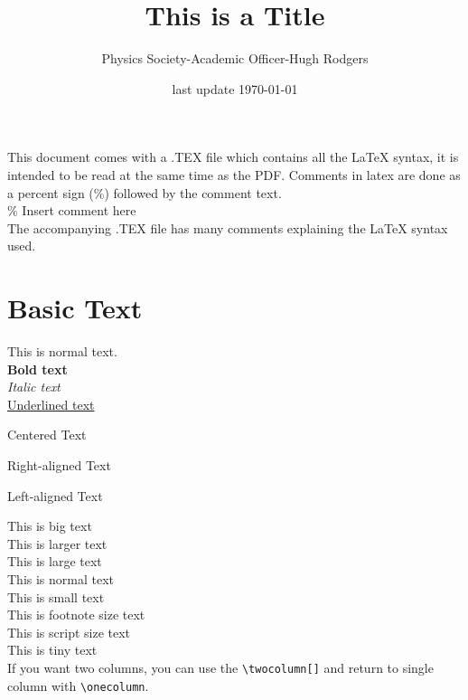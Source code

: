 \documentclass[a4paper,11pt]{article}
\title{This is a Title}
\author{Physics Society-Academic Officer-Hugh Rodgers}
\date{last update \today}
\begin{document}
    \maketitle
    \tableofcontents
    \newpage
    \raggedright

    This document comes with a .TEX file which contains all the LaTeX syntax, it is intended to be read at the same time as the PDF.
    Comments in latex are done as a  percent sign (\%) followed by the comment text. \\ 
    \% Insert comment here\\
    The accompanying .TEX file has many comments explaining the LaTeX syntax used.

    \section{Basic Text}
        This is normal text.\\
        \textbf{Bold text}\\
        \textit{Italic text}\\
        \underline{Underlined text}
        \begin{center}
            Centered Text
        \end{center}

        \begin{flushright}
            Right-aligned Text
        \end{flushright}

        \begin{flushleft}
            Left-aligned Text
        \end{flushleft}

        \Huge{This is big text}\\
        \LARGE{This is larger text}\\
        \Large{This is large text}\\
        \normalsize{This is normal text}\\
        \small{This is small text}\\
        \footnotesize{This is footnote size text}\\
        \scriptsize{This is script size text}\\
        \tiny{This is tiny text}\\

        \normalsize
        If you want two columns, you can use the \texttt{\textbackslash twocolumn[]} and return to single column with \texttt{\textbackslash onecolumn}.
\end{document}
